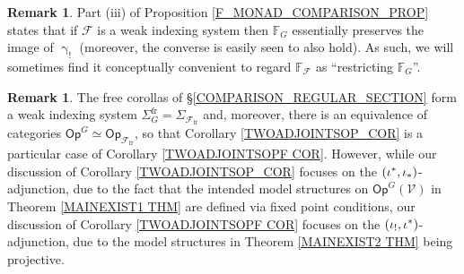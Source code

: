 \documentclass[a4paper,10pt
,draft
]{article}%
\numberwithin{equation}{section}
\numberwithin{figure}{section}
\theoremstyle{definition} %
\newtheorem{remark}[equation]{Remark}%
\newcommand{\Op}{\mathsf{Op}}%
\newcommand{\F}{\ensuremath{\mathcal F}}
\newcommand{\1}{\ensuremath{\mathbbm 1}}%
\begin{document}
\begin{remark}\label{WINDEX_GAMMA_REM}
Part (iii) of Proposition \ref{F_MONAD_COMPARISON_PROP}
states that if $\mathcal{F}$ is a weak indexing system then $\mathbb{F}_G$ essentially preserves the image of $\upgamma_!$ (moreover, the converse is easily seen to also hold).
As such, we will sometimes find it conceptually convenient
to regard $\mathbb{F}_{\mathcal{F}}$ as
``restricting $\mathbb{F}_G$''.
\end{remark}

%
        
\begin{remark}        
	The free corollas of \S	\ref{COMPARISON_REGULAR_SECTION}
	form a weak indexing system
	$\Sigma_G^{\text{fr}} = \Sigma_{\F_{\text{fr}}}$
	and, moreover, there is an equivalence of categories
	$\Op^G \simeq \Op_{\F_{\text{fr}}}$,
	so that Corollary \ref{TWOADJOINTSOP_COR}
	is a particular case of 
	Corollary \ref{TWOADJOINTSOPF COR}.
	However, while our discussion of 
	Corollary \ref{TWOADJOINTSOP_COR}
	focuses on the $(\iota^{\**},\iota_{\**})$-adjunction, due to the fact that the intended model structures on $\mathsf{Op}^G(\mathcal{V})$ in
	Theorem \ref{MAINEXIST1 THM} are defined via fixed point conditions, 
	our discussion of 
	Corollary \ref{TWOADJOINTSOPF COR}
	focuses on the $(\iota_{!},\iota^{\**})$-adjunction, due to the model structures in 
	Theorem \ref{MAINEXIST2 THM} being projective.
\end{remark}
\end{document}
